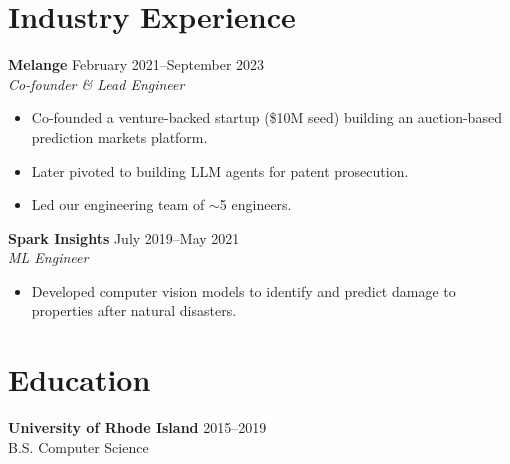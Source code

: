 \documentclass[11pt,a4paper]{article}
\begin{document}
\section{Industry Experience}

\textbf{Melange} \hfill February 2021--September 2023 \\
\textit{Co-founder \& Lead Engineer}
\begin{itemize}[noitemsep,topsep=2pt,leftmargin=15pt,label=\textendash]
    \item Co-founded a venture-backed startup (\$10M seed) building an auction-based prediction markets platform.
    \item Later pivoted to building LLM agents for patent prosecution.
    \item Led our engineering team of $\sim$5 engineers.
\end{itemize}
\vspace{5pt}

\textbf{Spark Insights} \hfill July 2019--May 2021 \\
\textit{ML Engineer}
\begin{itemize}[noitemsep,topsep=2pt,leftmargin=15pt,label=\textendash]
    \item Developed computer vision models to identify and predict damage to properties after natural disasters.
\end{itemize}

\section{Education}

\textbf{University of Rhode Island} \hfill 2015--2019 \\
B.S. Computer Science
\end{document}

